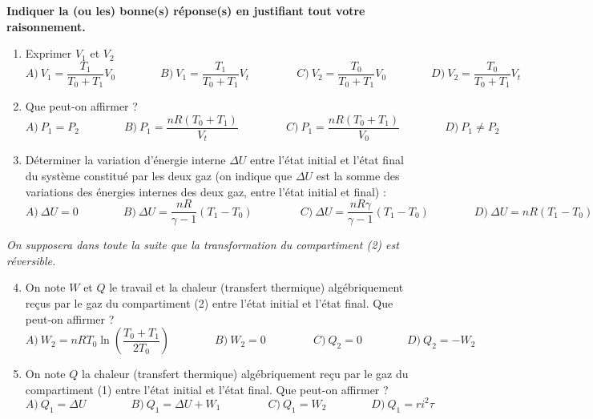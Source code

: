 \documentclass[a4paper, 12pt, garamond]{book}
\begin{document}
\begin{center}

	\textbf{Indiquer la (ou les) bonne(s) réponse(s) en justifiant tout
		votre raisonnement.}

\end{center}

\begin{enumerate}
	\item
	      Exprimer \(V_1\) et \(V_2\)
	      \[ A) \ V_1 = \frac{T_1}{T_0 + T_1}V_0 \qquad\qquad B) \ V_1 = \frac{T_1}{T_0 + T_1}V_t \ \qquad\qquad C) \ V_2 = \frac{T_0}{T_0 + T_1}V_0 \qquad\qquad D) \ V_2 = \frac{T_0}{T_0 + T_1}V_t\]
	\item
	      Que peut-on affirmer ?
	      \[ A) \ P_1 = P_2 \qquad\qquad B) \ P_1 = \frac{nR(T_0 + T_1)}{V_t} \ \qquad\qquad C) \ P_1 = \frac{nR(T_0 + T_1)}{V_0} \qquad\qquad D) \ P_1 \neq P_2\]
	\item
	      Déterminer la variation d'énergie interne \(\Delta U\) entre l'état
	      initial et l'état final du système constitué par les deux gaz (on
	      indique que \(\Delta U\) est la somme des variations des énergies
	      internes des deux gaz, entre l'état initial et final) :
	      \[ A) \ \Delta U = 0 \qquad\qquad B) \ \Delta U = \frac{nR}{\gamma -1}(T_1 - T_0) \ \qquad\qquad C) \ \Delta U = \frac{nR\gamma}{\gamma -1}(T_1 - T_0) \qquad\qquad D) \ \Delta U = nR(T_1 - T_0)\]
\end{enumerate}

\emph{On supposera dans toute la suite que la transformation du
	compartiment (2) est réversible.}

\begin{enumerate}
	\setcounter{enumi}{3}
	\item
	      On note \(W\) et \(Q\) le travail et la chaleur (transfert thermique)
	      algébriquement reçus par le gaz du compartiment (2) entre l'état
	      initial et l'état final. Que peut-on affirmer ?
	      \[ A) \ W_2 = nRT_0\ln\left(\frac{T_0 + T_1}{2T_0}\right) \qquad\qquad B) \ W_2 = 0 \ \qquad\qquad C) \ Q_2 = 0 \qquad\qquad D) \ Q_2 = -W_2\]
	\item
	      On note \(Q\) la chaleur (transfert thermique) algébriquement reçu par
	      le gaz du compartiment (1) entre l'état initial et l'état final. Que
	      peut-on affirmer ?
	      \[ A) \ Q_1 = \Delta U \qquad\qquad B) \ Q_1 = \Delta U + W_1 \ \qquad\qquad C) \ Q_1 = W_2 \qquad\qquad D) \ Q_1 = ri^2\tau\]
\end{enumerate}
\end{document}
